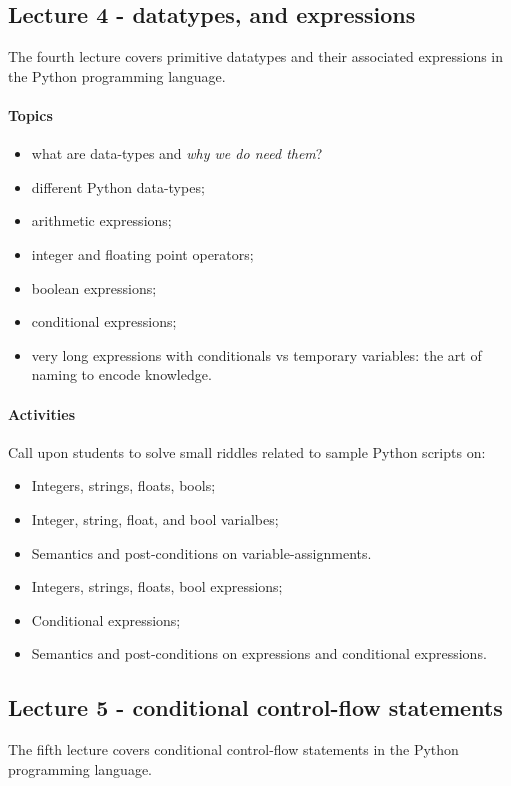 			\subsection{Lecture 4 - datatypes, and expressions}
				The fourth lecture covers primitive datatypes and their associated expressions in the Python programming language.

				\paragraph*{Topics}
					\begin{itemize}
						\item what are data-types and \textit{why we do need them}?
						\item different Python data-types;
						\item arithmetic expressions;
						\item integer and floating point operators;
						\item boolean expressions;
						\item conditional expressions;
						\item very long expressions with conditionals vs temporary variables: the art of naming to encode knowledge.
					\end{itemize}

				\paragraph*{Activities}
					Call upon students to solve small riddles related to sample Python scripts on:

					\begin{itemize}
						\item Integers, strings, floats, bools;
						\item Integer, string, float, and bool varialbes;
						\item Semantics and post-conditions on variable-assignments.
						\item Integers, strings, floats, bool expressions;
						\item Conditional expressions;
						\item Semantics and post-conditions on expressions and conditional expressions.
					\end{itemize}

			\subsection{Lecture 5 - conditional control-flow statements}
				The fifth lecture covers conditional control-flow statements in the Python programming language.

